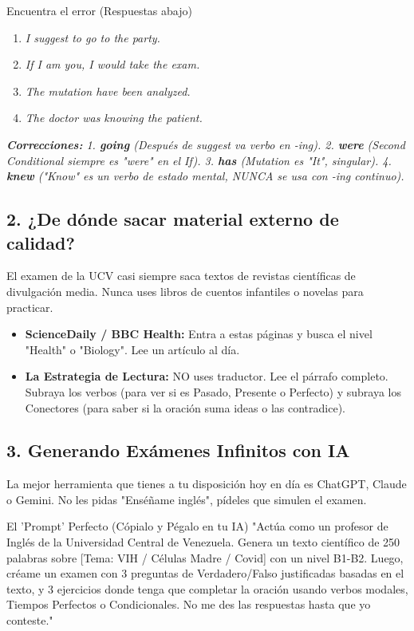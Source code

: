 \documentclass[11pt,a4paper]{article}
\begin{document}
\begin{hackbox}{Encuentra el error (Respuestas abajo)}
    \begin{enumerate}[noitemsep]
        \item \textit{I suggest to go to the party.}
        \item \textit{If I am you, I would take the exam.}
        \item \textit{The mutation have been analyzed.}
        \item \textit{The doctor was knowing the patient.}
    \end{enumerate}
\end{hackbox}
\textit{\textbf{Correcciones:} 1. \textbf{going} (Después de suggest va verbo en -ing). 2. \textbf{were} (Second Conditional siempre es "were" en el If). 3. \textbf{has} (Mutation es "It", singular). 4. \textbf{knew} ("Know" es un verbo de estado mental, NUNCA se usa con -ing continuo).}

\subsection{2. ¿De dónde sacar material externo de calidad?}
El examen de la UCV casi siempre saca textos de revistas científicas de divulgación media. Nunca uses libros de cuentos infantiles o novelas para practicar.
\begin{itemize}
    \item \textbf{ScienceDaily / BBC Health:} Entra a estas páginas y busca el nivel "Health" o "Biology". Lee un artículo al día.
    \item \textbf{La Estrategia de Lectura:} NO uses traductor. Lee el párrafo completo. Subraya los verbos (para ver si es Pasado, Presente o Perfecto) y subraya los Conectores (para saber si la oración suma ideas o las contradice).
\end{itemize}

\subsection{3. Generando Exámenes Infinitos con IA}
La mejor herramienta que tienes a tu disposición hoy en día es ChatGPT, Claude o Gemini. No les pidas "Enséñame inglés", pídeles que simulen el examen.

\begin{trapbox}{El 'Prompt' Perfecto (Cópialo y Pégalo en tu IA)}
    "Actúa como un profesor de Inglés de la Universidad Central de Venezuela. Genera un texto científico de 250 palabras sobre [Tema: VIH / Células Madre / Covid] con un nivel B1-B2. Luego, créame un examen con 3 preguntas de Verdadero/Falso justificadas basadas en el texto, y 3 ejercicios donde tenga que completar la oración usando verbos modales, Tiempos Perfectos o Condicionales. No me des las respuestas hasta que yo conteste."
\end{trapbox}
\end{document}
